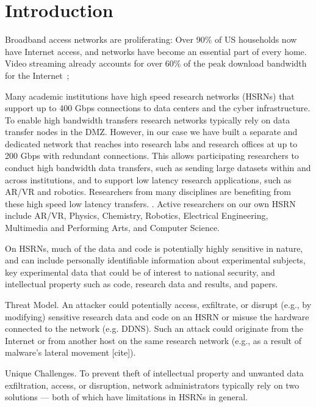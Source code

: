 \begin{center}
{\large \bf \TITLE}
\end{center}

\section{Introduction}

Broadband access networks are proliferating: Over 90\% of US households
now have Internet access, and networks have become an essential part of
every home.  Video streaming already accounts for over 60\% of the peak
download bandwidth for the Internet~\cite{www-bismark};

Many academic institutions have high speed research networks (HSRNs) that support up to 400 Gbps connections to data centers and the cyber infrastructure. To enable high bandwidth transfers research networks typically rely on data transfer nodes in the DMZ. However, in our case we have built a separate and dedicated network that reaches into research labs and research offices at up to 200 Gbps with redundant connections. This allows participating researchers to conduct high bandwidth data transfers, such as sending large datasets within and across institutions, and to support  low latency research applications, such as AR/VR and robotics. Researchers from many disciplines are benefiting from these high speed low latency transfers. . Active researchers on our own HSRN include AR/VR, Physics, Chemistry, Robotics, Electrical Engineering, Multimedia and Performing Arts, and Computer Science.

On HSRNs, much of the data and code is potentially highly sensitive in nature, and can include personally identifiable information about experimental subjects, key experimental data that could be of interest to national security, and intellectual property such as code, research data and results, and papers.

Threat Model. An attacker could potentially access, exfiltrate, or disrupt (e.g., by modifying) sensitive research data and code on an HSRN or misuse the hardware connected to the network (e.g. DDNS). Such an  attack could originate from the Internet or from another host on the same research network (e.g., as a result of malware's lateral movement [cite]).

Unique Challenges. To prevent theft of intellectual property and unwanted data exfiltration, access, or disruption, network administrators typically rely on two solutions — both of which have limitations in HSRNs in general.

